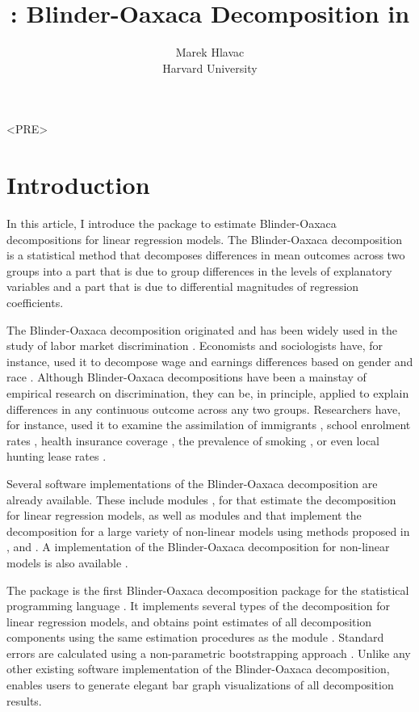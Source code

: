 <PRE>\documentclass[nojss]{jss}
\author{Marek Hlavac\\Harvard University}
\title{\pkg{oaxaca}: Blinder-Oaxaca Decomposition in \proglang{R}}
\begin{document}
\section{Introduction}
\label{Section1}

In this article, I introduce the  package  to estimate Blinder-Oaxaca decompositions for linear regression models. The Blinder-Oaxaca decomposition is a statistical method that decomposes differences in mean outcomes across two groups into a part that is due to group differences in the levels of explanatory variables and a part that is due to differential magnitudes of regression coefficients.


The Blinder-Oaxaca decomposition originated and has been widely used in the study of labor market discrimination \citep{Blinder1973, Oaxaca1973}. Economists and sociologists have, for instance, used it to decompose wage and earnings differences based on gender \citep[e.g.,][]{Stanley1998, Weichselbaumer2005} and race \citep[e.g.,][]{Darity1996, Kim2010}. Although Blinder-Oaxaca decompositions have been a mainstay of empirical research on discrimination, they can be, in principle, applied to explain differences in any continuous outcome across any two groups. Researchers have, for instance, used it to examine the assimilation of immigrants \citep{LaLondeTopel1992}, school enrolment rates \citep{BorooahIyer2005}, health insurance coverage \citep{Bustamante2009}, the prevalence of smoking \citep{BauerGohlmann2007}, or even local hunting lease rates \citep{MunnHussain2010}. 

Several software implementations of the Blinder-Oaxaca decomposition are already available. These include modules  \citep{Jann2008},  \citep{Watson2010} for  \citep{Stata} that estimate the decomposition for linear regression models, as well as  modules  \citep{Jann2006} and  \citep{SinningHahnBauer2008} that implement the decomposition for a large variety of non-linear models using methods proposed in \citet{Fairlie2005}, \citet{BauerSinning2008} and \citet{BauerSinning2010}. A  \citep{SAS} implementation of the Blinder-Oaxaca decomposition for non-linear models is also available \citep{Fairlie2013}.

The  package is the first Blinder-Oaxaca decomposition package for the  statistical programming language \citep{R}. It implements several types of the decomposition for linear regression models, and obtains point estimates of all decomposition components using the same estimation procedures as the  module  \citep{Jann2008}. Standard errors are calculated using a non-parametric bootstrapping approach \citep{Efron1979}. Unlike any other existing software implementation of the Blinder-Oaxaca decomposition,  enables users to generate elegant bar graph visualizations of all decomposition results.
\end{document}
